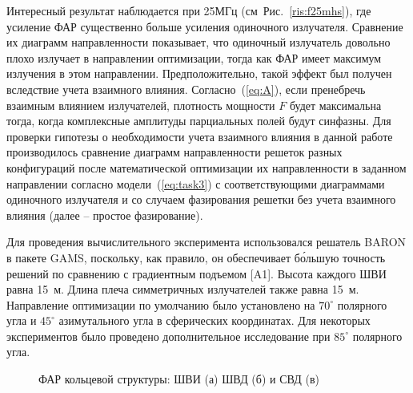 Интересный результат наблюдается при 25МГц (см~Рис.~\ref{ris:f25mhs}), где усиление ФАР существенно больше усиления одиночного излучателя. Сравнение их диаграмм направленности показывает, что одиночный излучатель довольно плохо излучает в направлении оптимизации, тогда как ФАР имеет максимум излучения в этом направлении. Предположительно, такой эффект был получен вследствие учета взаимного влияния. Согласно~(\ref{eq:A}), если пренебречь взаимным влиянием излучателей, плотность мощности $F$ будет максимальна тогда, когда комплексные амплитуды парциальных полей будут синфазны. Для проверки гипотезы о необходимости учета взаимного влияния в данной работе производилось сравнение диаграмм направленности решеток разных конфигураций после математической оптимизации их направленности в заданном направлении согласно модели~(\ref{eq:task3}) с соответствующими диаграммами одиночного излучателя и со случаем фазирования решетки без учета взаимного влияния (далее – простое фазирование).

Для проведения вычислительного эксперимента использовался решатель BARON в пакете GAMS, поскольку, как правило, он обеспечивает бо́льшую точность решений по сравнению с градиентным подъемом [A1]. Высота каждого ШВИ равна 15~м. Длина плеча симметричных излучателей также равна 15~м. Направление оптимизации по умолчанию было установлено на $70^{\circ}$ полярного угла и $45^{\circ}$ азимутального угла в сферических координатах. Для некоторых экспериментов было проведено дополнительное исследование при $85^{\circ}$ полярного угла.


\begin{figure}
    \begin{minipage}[h]{0.49\linewidth}
    \end{minipage}
    \hfill
    \begin{minipage}[h]{0.49\linewidth}
    \end{minipage}
    \begin{minipage}[h]{1\linewidth}
    \end{minipage}
    \caption{ФАР кольцевой структуры: ШВИ (а) ШВД (б) и СВД (в)}
    \label{pic:r_paas}
\end{figure}

